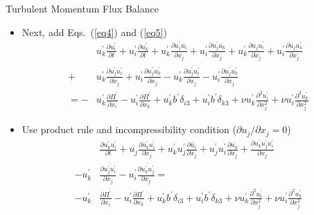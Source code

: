 \begin{frame}{Turbulent Momentum Flux Balance}
\begin{itemize}
  	\item Next, add Eqs.~(\ref{eq4}) and (\ref{eq5})
  	\small
  	\begin{align*}
  	& u_k^\prime\frac{\partial u_i^\prime}{\partial t} + u_i^\prime\frac{\partial u_k^\prime}{\partial t} + u_k^\prime\frac{\partial u_j^\prime \overline{u_i}}{\partial x_j} + u_i^\prime\frac{\partial u_j^\prime \overline{u_k}}{\partial x_j} + u_k^\prime\frac{\partial \overline{u_j} u_i^\prime}{\partial x_j} + u_i^\prime\frac{\partial \overline{u_j} u_k^\prime}{\partial x_j} \\
  	+ &u_k^\prime\frac{\partial u_j^\prime  u_i^\prime}{\partial x_j} + u_i^\prime\frac{\partial u_j^\prime  u_k^\prime}{\partial x_j} - u_k^\prime\frac{\partial \overline{u_j^\prime  u_i^\prime}}{\partial x_j} - u_i^\prime\frac{\partial \overline{u_j^\prime  u_k^\prime}}{\partial x_j}\\ 
  	= - & u_k^\prime\frac{\partial \Pi^\prime}{\partial x_i} - u_i^\prime\frac{\partial \Pi^\prime}{\partial x_k} + u_k^\prime b^\prime\delta_{i3} + u_i^\prime b^\prime\delta_{k3} + \nu u_k^\prime \frac{\partial^2 u_i^\prime}{\partial x_j^2} + \nu u_i^\prime \frac{\partial^2 u_k^\prime}{\partial x_j^2}	
  	\end{align*}
  	\item Use product rule and incompressibility condition ($\partial u_j/\partial x_j = 0$)
  	\begin{align*}
  	&	\frac{\partial u_k^\prime u_i^\prime	}{\partial t} + \overline{u_j} \frac{\partial u_k^\prime u_i^\prime}{\partial x_j} + u_k^\prime u_j^\prime \frac{\partial \overline{u_i}}{\partial x_j} + u_j^\prime u_i^\prime \frac{\partial \overline{u_k}}{\partial x_j} + \frac{\partial u_k^\prime u_j^\prime u_i^\prime}{\partial x_j} \\- u_k^\prime &\frac{\partial \overline{u_j^\prime u_i^\prime}}{\partial x_j} - u_i^\prime \frac{\partial \overline{u_k^\prime u_j^\prime}}{\partial x_j} = \\-u_k^\prime&\frac{\partial \Pi^\prime}{\partial x_i} - u_i^\prime\frac{\partial \Pi^\prime}{\partial x_k} + u_k^\prime b^\prime\delta_{i3} + u_i^\prime b^\prime\delta_{k3} + \nu u_k^\prime \frac{\partial^2 u_i^\prime}{\partial x_j^2} + \nu u_i^\prime \frac{\partial^2 u_k^\prime}{\partial x_j^2}
  	\end{align*}
  \end{itemize}
\end{frame}
